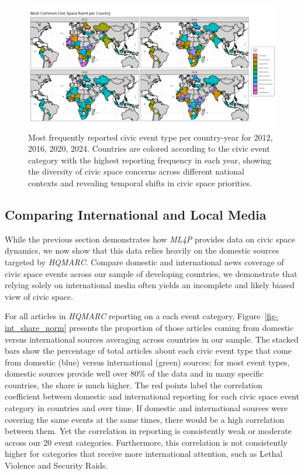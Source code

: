 \documentclass[
  letterpaper,
  DIV=11,
  numbers=noendperiod]{scrartcl}
\begin{document}
\begin{figure}

{\centering \includegraphics{descriptive_maps/figures/dominant_event_paper.png}

}

\caption{\label{fig-map_main_event}Most frequently reported civic event
type per country-year for 2012, 2016, 2020, 2024. Countries are colored
according to the civic event category with the highest reporting
frequency in each year, showing the diversity of civic space concerns
across different national contexts and revealing temporal shifts in
civic space priorities.}

\end{figure}

\hypertarget{comparing-international-and-local-media}{%
\subsection{Comparing International and Local
Media}\label{comparing-international-and-local-media}}

While the previous section demonstrates how \emph{ML4P} provides data on
civic space dynamics, we now show that this data relies heavily on the
domestic sources targeted by \emph{HQMARC}. Compare domestic and
international news coverage of civic space events across our sample of
developing countries, we demonstrate that relying solely on
international media often yields an incomplete and likely biased view of
civic space.

For all articles in \emph{HQMARC} reporting on a each event category,
Figure~\ref{fig-int_share_norm} presents the proportion of those
articles coming from domestic versus international sources averaging
across countries in our sample. The stacked bars show the percentage of
total articles about each civic event type that come from domestic
(blue) versus international (green) sources; for most event types,
domestic sources provide well over 80\% of the data and in many specific
countries, the share is much higher. The red points label the
correlation coefficient between domestic and international reporting for
each civic space event category in countries and over time. If domestic
and international sources were covering the same events at the same
times, there would be a high correlation between them. Yet the
correlation in reporting is consistently weak or moderate across our 20
event categories. Furthermore, this correlation is not consistently
higher for categories that receive more international attention, such as
Lethal Violence and Security Raids.
\end{document}
